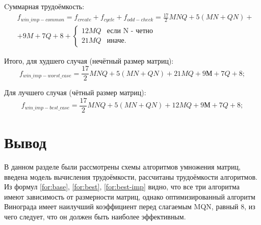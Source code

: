 Cуммарная трудоёмкость:
\begin{equation}
	\label{for:common-imp}
	\begin{split}
		&f_{win\_imp-common}=f_{create}+f_{cycle}+f_{odd-check}=\frac{17}{2}MNQ+5(MN+QN)+\\
		&+9M+7Q+8+\begin{cases}12MQ & \text{если N - четно}\\21MQ & \text{иначе.}\end{cases}
	\end{split}
\end{equation}


Итого, для худшего случая (нечётный размер матриц): 
\begin{equation}
	\label{for:worst-imp}
	f_{win\_imp-worst\_case}=\frac{17}{2}MNQ+5(MN+QN)+21MQ+9М+7Q+8;
\end{equation}

Для лучшего случая (чётный размер матриц): 
\begin{equation}
	\label{for:best-imp}
	f_{win\_imp-best\_case}=\frac{17}{2}MNQ+5(MN+QN)+12MQ+9М+7Q+8;
\end{equation}

\section{Вывод}

В данном разделе были рассмотрены схемы алгоритмов умножения
матриц, введена модель вычисления трудоёмкости, рассчитаны трудоёмкости
алгоритмов. Из формул \ref{for:base}, \ref{for:best}, \ref{for:best-imp} видно, что все три алгоритма имеют зависимость от размерности матриц,
однако оптимизированный алгоритм Винограда имеет наилучший коэффициент перед слагаемым MQN, равный 8, из чего
следует, что он должен быть наиболее эффективным.